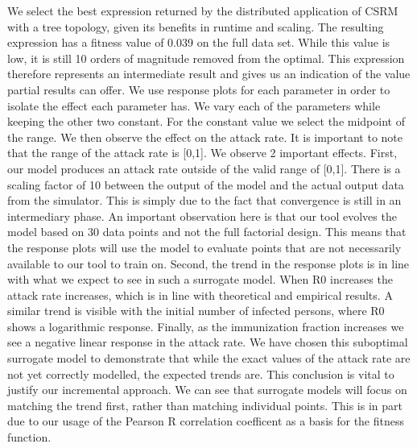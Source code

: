We select the best expression returned by the distributed application of CSRM with a tree topology, given its benefits in runtime and scaling. The resulting expression has a fitness value of 0.039 on the full data set. While this value is low, it is still 10 orders of magnitude removed from the optimal. This expression therefore represents an intermediate result and gives us an indication of the value partial results can offer. We use response plots for each parameter in order to isolate the effect each parameter has. We vary each of the parameters while keeping the other two constant. For the constant value we select the midpoint of the range. We then observe the effect on the attack rate. It is important to note that the range of the attack rate is [0,1]. We observe 2 important effects. First, our model produces an attack rate outside of the valid range of [0,1]. There is a scaling factor of 10 between the output of the model and the actual output data from the simulator. This is simply due to the fact that convergence is still in an intermediary phase. An important observation here is that our tool evolves the model based on 30 data points and not the full factorial design. This means that the response plots will use the model to evaluate points that are not necessarily available to our tool to train on. Second, the trend in the response plots is in line with what we expect to see in such a surrogate model. When R0 increases the attack rate increases, which is in line with theoretical and empirical results. A similar trend is visible with the initial number of infected persons, where R0 shows a logarithmic response. Finally, as the immunization fraction increases we see a negative linear response in the attack rate. We have chosen this suboptimal surrogate model to demonstrate that while the exact values of the attack rate are not yet correctly modelled, the expected trends are. This conclusion is vital to justify our incremental approach. We can see that surrogate models will focus on matching the trend first, rather than matching individual points. This is in part due to our usage of the Pearson R correlation coefficent as a basis for the fitness function. 

